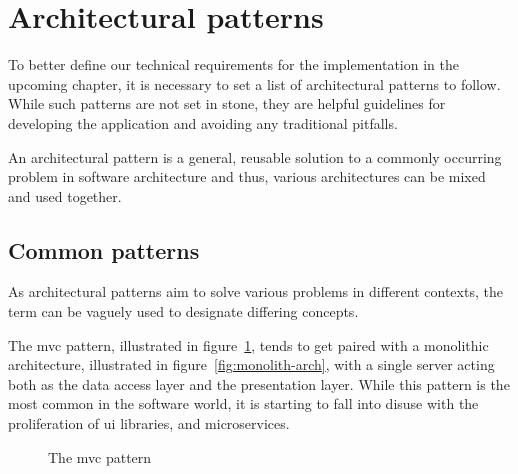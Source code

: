 \section{Architectural patterns}

To better define our technical requirements for the implementation in the upcoming chapter, it is necessary to set a list of architectural patterns to follow.
While such patterns are not set in stone, they are helpful guidelines for developing the application and avoiding any traditional pitfalls.

An architectural pattern is a general, reusable solution to a commonly occurring problem in software architecture and thus, various architectures can be mixed and used together.

\subsection{Common patterns}

As architectural patterns aim to solve various problems in different contexts, the term can be vaguely used to designate differing concepts.

The \acrshort{mvc} pattern, illustrated in figure~\ref{fig:mvc-arch}, tends to get paired with a monolithic architecture, illustrated in figure~\ref{fig:monolith-arch}, with a single server acting both as the data access layer and the presentation layer.
While this pattern is the most common in the software world, it is starting to fall into disuse with the proliferation of \acrshort{ui} libraries, and microservices.

\begin{figure}[H]
  \centerfloat
  \sffamily

  \caption{The \acrshort{mvc} pattern}
  \label{fig:mvc-arch}
\end{figure}

